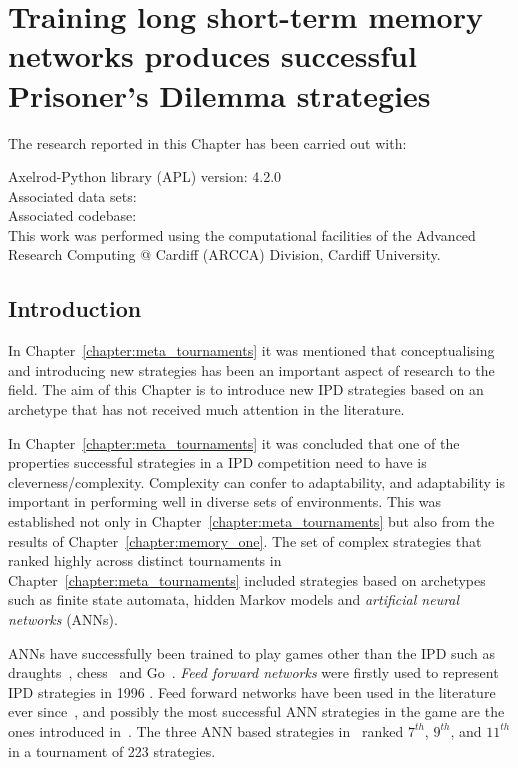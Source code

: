 \chapter{Training long short-term memory networks produces successful Prisoner's Dilemma strategies}\label{chapter:lstm}

\begin{center}
    The research reported in this Chapter has been carried out with:

    Axelrod-Python library (APL) version: 4.2.0 \\
    Associated data sets:~\cite{Glynatsi_2020_lstm_weights, Glynatsi_2020_training_data_sets} \\
    Associated codebase:~\cite{Glynatsi_2020_sensei} \\
    This work was performed using the computational facilities of the Advanced Research
    Computing @ Cardiff (ARCCA) Division, Cardiff University.\\ \vspace{.5cm} 
\end{center}

\hrulefill

\section{Introduction}

In Chapter~\ref{chapter:meta_tournaments} it was mentioned that conceptualising
and introducing new strategies has been an important aspect of research to the
field. The aim of this Chapter is to introduce new IPD strategies based on an
archetype that has not received much attention in the literature.

In Chapter~\ref{chapter:meta_tournaments} it was concluded that one of the
properties successful strategies in a IPD competition need to have is
cleverness/complexity. Complexity can confer to adaptability, and adaptability
is important in performing well in diverse sets of environments. This was
established not only in Chapter~\ref{chapter:meta_tournaments} but also from the
results of Chapter~\ref{chapter:memory_one}. The set of complex strategies that
ranked highly across distinct tournaments in
Chapter~\ref{chapter:meta_tournaments} included strategies based on archetypes
such as finite state automata, hidden Markov models and \textit{artificial
neural networks} (ANNs).

ANNs have successfully been trained to play games other than the IPD such as
draughts~\cite{Chellapilla1999}, chess~\cite{Fogel2004} and
Go~\cite{Silver2016}. \textit{Feed forward networks} were firstly used to represent IPD
strategies in 1996 \cite{Harrald1996}. Feed forward networks have been used in
the literature ever since~\cite{Ashlock2008, Ashlock2006a, Darwen2001,
Franken2005}, and possibly the most successful ANN strategies in the game are
the ones introduced in~\cite{Knight2017}. The three ANN based strategies
in~\cite{Knight2017} ranked \(7^{th}\), \(9^{th}\), and \(11^{th}\) in a
tournament of 223 strategies.

